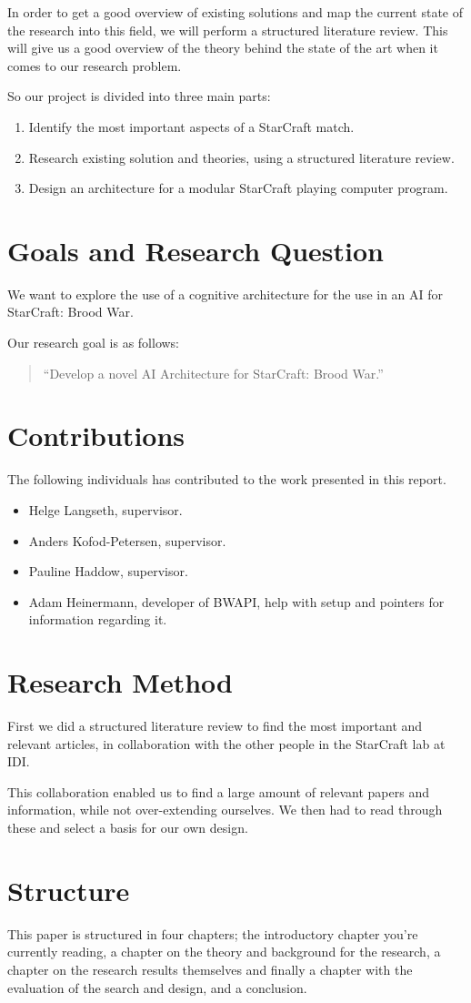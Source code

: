 In order to get a good overview of existing solutions and map the current state
of the research into this field, we will perform a structured literature review.
This will give us a good overview of the theory behind the state of the art
when it comes to our research problem.

So our project is divided into three main parts:
\begin{enumerate}
  \item Identify the most important aspects of a StarCraft match.
  \item Research existing solution and theories, using a structured literature
review.
  \item Design an architecture for a modular StarCraft playing computer program.
\end{enumerate}

\section{Goals and Research Question}
We want to explore the use of a cognitive architecture for the use in an AI for
StarCraft: Brood War.

Our research goal is as follows:
\begin{quote}
 ``Develop a novel AI Architecture for StarCraft: Brood War.''
\end{quote}


\section{Contributions}
The following individuals has contributed to the work presented in this report.

\begin{itemize}
 \item Helge Langseth, supervisor.
 \item Anders Kofod-Petersen, supervisor.
 \item Pauline Haddow, supervisor.
 \item Adam Heinermann, developer of BWAPI, help with setup and pointers for
information regarding it.
\end{itemize}


\section{Research Method}
First we did a structured literature review to find the most important and
relevant articles, in collaboration with the other people in the StarCraft lab
at IDI.

This collaboration enabled us to find a large amount of relevant papers and
information, while not over-extending ourselves. We then had to read through
these and select a basis for our own design.


\section{Structure}
This paper is structured in four chapters; the introductory chapter you're
currently reading, a chapter on the theory and background for the research, a
chapter on the research results themselves and finally a chapter with the
evaluation of the search and design, and a conclusion.